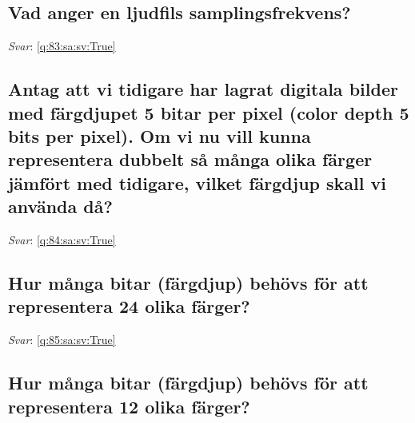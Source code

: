 \documentclass[a4paper,11pt,oneside]{article}
\begin{document}
\begin{sloppypar}
\subsection{Vad anger en ljudfils samplingsfrekvens?}

\label{q:83:sa:sv:False}

\vspace{2cm}

\noindent\makebox[\textwidth]{\hrulefill}

\vspace{1cm}

\textit{Svar}: \autoref{q:83:sa:sv:True}



\subsection{Antag att vi tidigare har lagrat digitala bilder med f\"argdjupet 5 bitar per pixel (color depth 5 bits per pixel). Om vi nu vill kunna representera dubbelt s\r{a} m\r{a}nga olika f\"arger j\"amf\"ort med tidigare, vilket f\"argdjup skall vi anv\"anda d\r{a}?}

\label{q:84:sa:sv:False}

\vspace{2cm}

\noindent\makebox[\textwidth]{\hrulefill}

\vspace{1cm}

\textit{Svar}: \autoref{q:84:sa:sv:True}



\subsection{Hur m\r{a}nga bitar (f\"argdjup) beh\"ovs f\"or att representera 24 olika f\"arger?}

\label{q:85:sa:sv:False}

\vspace{2cm}

\noindent\makebox[\textwidth]{\hrulefill}

\vspace{1cm}

\textit{Svar}: \autoref{q:85:sa:sv:True}



\subsection{Hur m\r{a}nga bitar (f\"argdjup) beh\"ovs f\"or att representera 12 olika f\"arger?}


\end{sloppypar}
\end{document}
